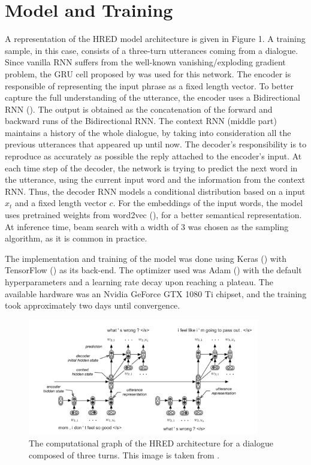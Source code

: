 \documentclass{article}
\begin{document}
\section{Model and Training}

A representation of the HRED model architecture is given in Figure 1. A training sample, in this case, consists of a three-turn utterances coming from a dialogue. Since vanilla RNN suffers from the well-known vanishing/exploding gradient problem, the GRU cell proposed by \citet{DBLP:journals/corr/ChoMGBSB14} was used for this network. The encoder is responsible of representing the input phrase as a fixed length vector. To better capture the full understanding of the utterance, the encoder uses a Bidirectional RNN (\citet{650093}). The output is obtained as the concatenation of the forward and backward runs of the Bidirectional RNN. The context RNN (middle part) maintains a history of the whole dialogue, by taking into consideration all the previous utterances that appeared up until now. The decoder's responsibility is to reproduce as accurately as possible the reply attached to the encoder's input. At each time step of the decoder, the network is trying to predict the next word in the utterance, using the current input word and the information from the context RNN. Thus, the decoder RNN models a conditional distribution based on a input \(x_t\) and a fixed length vector \(c\). For the embeddings of the input words, the model uses pretrained weights from word2vec (\citet{DBLP:journals/corr/abs-1301-3781}), for a better semantical representation.  At inference time, beam search with a width of 3 was chosen as the sampling algorithm, as it is common in practice.

The implementation and training of the model was done using Keras (\citet{chollet2015keras}) with TensorFlow (\citet{tensorflow2015-whitepaper}) as its back-end. The optimizer used was Adam (\cite{DBLP:journals/corr/KingmaB14}) with the default hyperparameters and a learning rate decay upon reaching a plateau. The available hardware was an Nvidia GeForce GTX 1080 Ti chipset, and the training took approximately two days until convergence.

\begin{figure}
    \centering
        \includegraphics[width=0.9\textwidth]{images/hred.png}
        \caption{The computational graph of the HRED architecture for a dialogue composed of three turns. This image is taken from \citet{DBLP:journals/corr/SerbanSBCP15}.}
    \end{figure}
\end{document}

